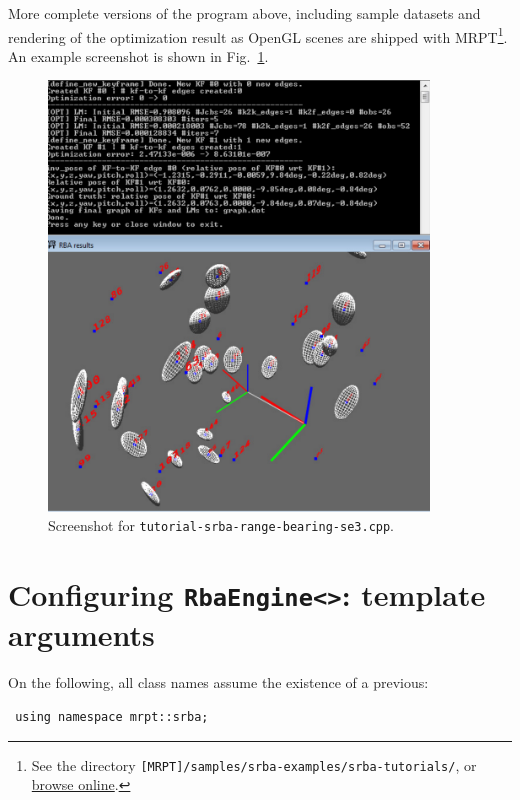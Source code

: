 \documentclass[a4paper,11pt]{article}
\begin{document}
More complete versions of the program above, including sample datasets and rendering of the optimization result 
as OpenGL scenes are shipped with MRPT\footnote{See the directory \texttt{[MRPT]/samples/srba-examples/srba-tutorials/}, 
or \href{http://mrpt.googlecode.com/svn/trunk/samples/srba-examples/srba-tutorials/}{browse online}.}.
An example screenshot is shown in Fig.~\ref{fig:screenshot.tutorial1}.

\begin{figure}[h]
\centering
\includegraphics[width=0.9\textwidth]{imgs/screenshot_tutorial_range-bearing-3D.pdf} 
\caption{Screenshot for \texttt{tutorial-srba-range-bearing-se3.cpp}.}
\label{fig:screenshot.tutorial1}
\end{figure}

\newpage

\section{Configuring \texttt{RbaEngine<>}: template arguments}
\label{sect:rba_configs}

On the following, all class names assume the existence of a previous:

\begin{lstlisting}
 using namespace mrpt::srba;
\end{lstlisting}
\end{document}
